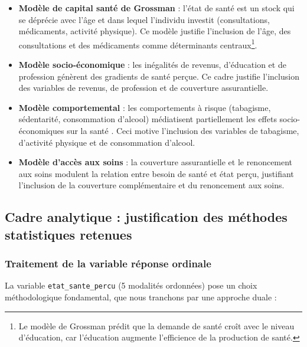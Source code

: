 \documentclass[11pt,a4paper]{memoirerecherche}
\providecommand{\tightlist}{%
  \setlength{\itemsep}{0pt}\setlength{\parskip}{0pt}}
\begin{document}
\begin{itemize}
\tightlist
\item
  \textbf{Modèle de capital santé de Grossman} \autocite{grossman1972} : l'état de santé est un stock qui se déprécie avec l'âge et dans lequel l'individu investit (consultations, médicaments, activité physique). Ce modèle justifie l'inclusion de l'âge, des consultations et des médicaments comme déterminants centraux\footnote{Le modèle de Grossman prédit que la demande de santé croît avec le niveau d'éducation, car l'éducation augmente l'efficience de la production de santé.}.
\item
  \textbf{Modèle socio-économique} \autocite{marmot2005} : les inégalités de revenus, d'éducation et de profession génèrent des gradients de santé perçue. Ce cadre justifie l'inclusion des variables de revenus, de profession et de couverture assurantielle.
\item
  \textbf{Modèle comportemental} : les comportements à risque (tabagisme, sédentarité, consommation d'alcool) médiatisent partiellement les effets socio-économiques sur la santé \autocite{bricard2015}. Ceci motive l'inclusion des variables de tabagisme, d'activité physique et de consommation d'alcool.
\item
  \textbf{Modèle d'accès aux soins} \autocite{despres2011} : la couverture assurantielle et le renoncement aux soins modulent la relation entre besoin de santé et état perçu, justifiant l'inclusion de la couverture complémentaire et du renoncement aux soins.
\end{itemize}

\hypertarget{cadre-analytique-justification-des-muxe9thodes-statistiques-retenues}{%
\subsection{Cadre analytique : justification des méthodes statistiques retenues}\label{cadre-analytique-justification-des-muxe9thodes-statistiques-retenues}}

\hypertarget{traitement-de-la-variable-ruxe9ponse-ordinale}{%
\subsubsection{Traitement de la variable réponse ordinale}\label{traitement-de-la-variable-ruxe9ponse-ordinale}}

La variable \texttt{etat\_sante\_percu} (5 modalités ordonnées) pose un choix méthodologique fondamental, que nous tranchons par une approche duale :
\end{document}
